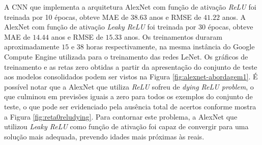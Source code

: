 A CNN que implementa a arquitetura AlexNet com função de ativação \emph{ReLU} foi treinada por 10 épocas, obteve MAE de $38.63$ anos e RMSE de $41.22$ anos. A AlexNet com função de ativação \emph{Leaky ReLU} foi treinada por 30 épocas, obteve MAE de $14.44$ anos e RMSE de $15.33$ anos. Os treinamentos duraram aproximadamente $15$ e $38$ horas respectivamente, na mesma instância do Google Compute Engine utilizada para o treinamento das redes LeNet. Os gráficos de treinamento e as retas zero obtidas a partir da apresentação do conjunto de teste aos modelos consolidados podem ser vistos na Figura \ref{fig:alexnet-abordagem1}. É possível notar que a AlexNet que utiliza \emph{ReLU} sofreu de \emph{dying ReLU problem}, o que culminou em previsões iguais a zero para todos os exemplos do conjunto de teste, o que pode ser evidenciado pela ausência total de acertos conforme mostra a Figura \ref{fig:reta0reludying}. Para contornar este problema, a AlexNet que utilizou \emph{Leaky ReLU} como função de ativação foi capaz de convergir para uma solução mais adequada, prevendo idades mais próximas às reais.

